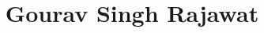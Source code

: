 \documentclass[11pt,a4paper]{article}
\begin{document}
\title{Gourav Singh Rajawat}
\author{}
\date{}
\maketitle
\end{document}
